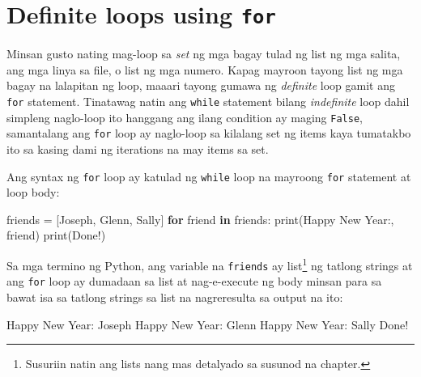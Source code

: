 \documentclass[10pt,]{book}
\newenvironment{Shaded}{}{}
\newcommand{\BuiltInTok}[1]{\textcolor[rgb]{0.00,0.50,0.00}{#1}}
\newcommand{\ControlFlowTok}[1]{\textcolor[rgb]{0.00,0.44,0.13}{\textbf{#1}}}
\newcommand{\KeywordTok}[1]{\textcolor[rgb]{0.00,0.44,0.13}{\textbf{#1}}}
\newcommand{\NormalTok}[1]{#1}
\newcommand{\OperatorTok}[1]{\textcolor[rgb]{0.40,0.40,0.40}{#1}}
\newcommand{\StringTok}[1]{\textcolor[rgb]{0.25,0.44,0.63}{#1}}
\begin{document}
\section{\texorpdfstring{Definite loops using
\texttt{for}}{Definite loops using for}}\label{definite-loops-using-for}

 

Minsan gusto nating mag-loop sa \emph{set} ng mga bagay tulad ng list ng
mga salita, ang mga linya sa file, o list ng mga numero. Kapag mayroon
tayong list ng mga bagay na lalapitan ng loop, maaari tayong gumawa ng
\emph{definite} loop gamit ang \texttt{for} statement. Tinatawag natin
ang \texttt{while} statement bilang \emph{indefinite} loop dahil
simpleng naglo-loop ito hanggang ang ilang condition ay maging
\texttt{False}, samantalang ang \texttt{for} loop ay naglo-loop sa
kilalang set ng items kaya tumatakbo ito sa kasing dami ng iterations na
may items sa set.

Ang syntax ng \texttt{for} loop ay katulad ng \texttt{while} loop na
mayroong \texttt{for} statement at loop body:

\begin{Shaded}
\begin{Highlighting}[]
\NormalTok{friends }\OperatorTok{=}\NormalTok{ [}\StringTok{\textquotesingle{}Joseph\textquotesingle{}}\NormalTok{, }\StringTok{\textquotesingle{}Glenn\textquotesingle{}}\NormalTok{, }\StringTok{\textquotesingle{}Sally\textquotesingle{}}\NormalTok{]}
\ControlFlowTok{for}\NormalTok{ friend }\KeywordTok{in}\NormalTok{ friends:}
    \BuiltInTok{print}\NormalTok{(}\StringTok{\textquotesingle{}Happy New Year:\textquotesingle{}}\NormalTok{, friend)}
\BuiltInTok{print}\NormalTok{(}\StringTok{\textquotesingle{}Done!\textquotesingle{}}\NormalTok{)}
\end{Highlighting}
\end{Shaded}

Sa mga termino ng Python, ang variable na \texttt{friends} ay
list\footnote{Susuriin natin ang lists nang mas detalyado sa susunod na
  chapter.} ng tatlong strings at ang \texttt{for} loop ay dumadaan sa
list at nag-e-execute ng body minsan para sa bawat isa sa tatlong
strings sa list na nagreresulta sa output na ito:

\begin{Shaded}
\begin{Highlighting}[]
\NormalTok{Happy New Year: Joseph}
\NormalTok{Happy New Year: Glenn}
\NormalTok{Happy New Year: Sally}
\NormalTok{Done}\OperatorTok{!}
\end{Highlighting}
\end{Shaded}
\end{document}
